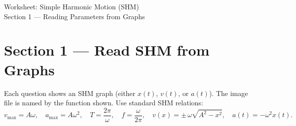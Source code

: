 \documentclass[12pt]{article}
\begin{document}
\begin{center}
{\LARGE Worksheet: Simple Harmonic Motion (SHM)}\\[2pt]
{\large Section 1 — Reading Parameters from Graphs}\\[4pt]
\end{center}

\section*{Section 1 — Read SHM from Graphs}
Each question shows an SHM graph (either \(x(t)\), \(v(t)\), or \(a(t)\)). The image file is named by the function shown. Use standard SHM relations:
\[
v_{\max}=A\omega,\quad a_{\max}=A\omega^{2},\quad
T=\frac{2\pi}{\omega},\quad f=\frac{\omega}{2\pi},\quad
v(x)=\pm\,\omega\sqrt{A^{2}-x^{2}},\quad a(t)=-\omega^{2}x(t).
\]
\end{document}
